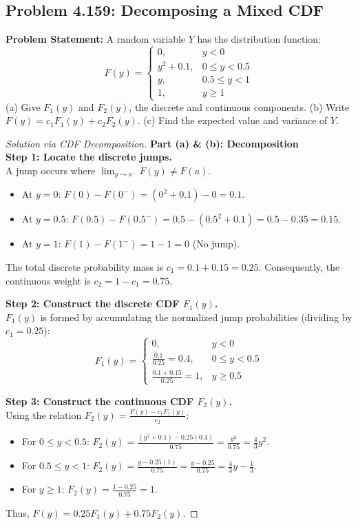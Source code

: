 \documentclass[11pt, a4paper]{article}
\theoremstyle{definition}
\theoremstyle{remark}
\begin{document}
\subsection{Problem 4.159: Decomposing a Mixed CDF}
\textbf{Problem Statement:} A random variable $Y$ has the distribution function:
\[ F(y) = \begin{cases} 0, & y < 0 \\ y^2 + 0.1, & 0 \le y < 0.5 \\ y, & 0.5 \le y < 1 \\ 1, & y \ge 1 \end{cases} \]
(a) Give $F_1(y)$ and $F_2(y)$, the discrete and continuous components. 
(b) Write $F(y) = c_1 F_1(y) + c_2 F_2(y)$. 
(c) Find the expected value and variance of $Y$.

\begin{proof}[Solution via CDF Decomposition]
\textbf{Part (a) \& (b): Decomposition} \\
\textbf{Step 1: Locate the discrete jumps.} \\
A jump occurs where $\lim_{y \to a^-} F(y) \neq F(a)$.
\begin{itemize}
    \item At $y = 0$: $F(0) - F(0^-) = (0^2 + 0.1) - 0 = 0.1$.
    \item At $y = 0.5$: $F(0.5) - F(0.5^-) = 0.5 - (0.5^2 + 0.1) = 0.5 - 0.35 = 0.15$.
    \item At $y = 1$: $F(1) - F(1^-) = 1 - 1 = 0$ (No jump).
\end{itemize}
The total discrete probability mass is $c_1 = 0.1 + 0.15 = 0.25$. Consequently, the continuous weight is $c_2 = 1 - c_1 = 0.75$.

\textbf{Step 2: Construct the discrete CDF $F_1(y)$.} \\
$F_1(y)$ is formed by accumulating the normalized jump probabilities (dividing by $c_1 = 0.25$):
\[ F_1(y) = \begin{cases} 0, & y < 0 \\ \frac{0.1}{0.25} = 0.4, & 0 \le y < 0.5 \\ \frac{0.1 + 0.15}{0.25} = 1, & y \ge 0.5 \end{cases} \]

\textbf{Step 3: Construct the continuous CDF $F_2(y)$.} \\
Using the relation $F_2(y) = \frac{F(y) - c_1 F_1(y)}{c_2}$:
\begin{itemize}
    \item For $0 \le y < 0.5$: $F_2(y) = \frac{(y^2 + 0.1) - 0.25(0.4)}{0.75} = \frac{y^2}{0.75} = \frac{4}{3}y^2$.
    \item For $0.5 \le y < 1$: $F_2(y) = \frac{y - 0.25(1)}{0.75} = \frac{y - 0.25}{0.75} = \frac{4}{3}y - \frac{1}{3}$.
    \item For $y \ge 1$: $F_2(y) = \frac{1 - 0.25}{0.75} = 1$.
\end{itemize}
Thus, $F(y) = 0.25 F_1(y) + 0.75 F_2(y)$.


\end{proof}
\end{document}
